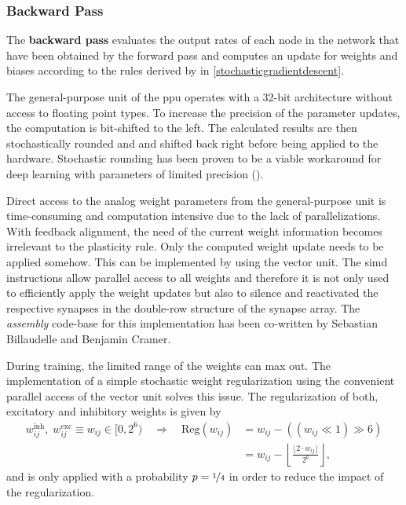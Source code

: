 \subsubsection*{Backward Pass}
The \textbf{backward pass} evaluates the output rates of each node in the network that have been obtained by the forward pass and computes an update for weights and biases according to the rules derived by  in \cref{stochasticgradientdescent}.

The general-purpose unit of the \gls{ppu} operates with a 32-bit architecture without access to floating point types. To increase the precision of the parameter updates, the computation is bit-shifted to the left. The calculated results are then stochastically rounded and and shifted back right before being applied to the hardware. Stochastic rounding has been proven to be a viable workaround for deep learning with parameters of limited precision (\citealp{limitedprecisionpaper}).

Direct access to the analog weight parameters from the general-purpose unit is time-consuming and computation intensive due to the lack of parallelizations. With feedback alignment, the need of the current weight information becomes irrelevant to the plasticity rule. Only the computed weight update needs to be applied somehow. This can be implemented by using the vector unit. The \gls{simd} instructions allow parallel access to all weights and therefore it is not only used to efficiently apply the weight updates but also to silence and reactivated the respective synapses in the double-row structure of the synapse array. The \emph{assembly} code-base for this implementation has been co-written by Sebastian Billaudelle and Benjamin Cramer.

During training, the limited range of the weights can max out. The implementation of a simple stochastic weight regularization using the convenient parallel access of the vector unit solves this issue. The regularization of both, excitatory and inhibitory weights is given by
\begin{align*}
w_{ij}^\text{inh},\; w_{ij}^\text{exc}\equiv w_{ij} \in [0,2^6) \quad  \Rightarrow \quad \text{Reg}(w_{ij}) &= w_{ij} - \left(\left(w_{ij} \ll 1\right) \gg 6\right) \nonumber \\
&= w_{ij} - \left\lfloor \frac{\lfloor 2 \cdot w_{ij}  \rfloor}{2^{6}} \right\rfloor,								
\end{align*}
and is only applied with a probability $p=\nicefrac{1}{4}$ in order to reduce the impact of the regularization.

